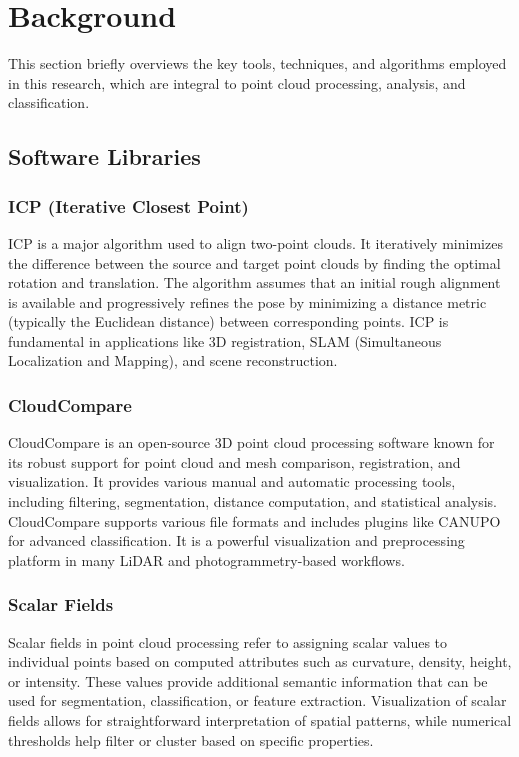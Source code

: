 \documentclass[../report.tex]{subfiles}
\begin{document}
    \section{Background}
    \label{sec:background}
    This section briefly overviews the key tools, techniques, and algorithms employed in this research, which are integral to point cloud processing, analysis, and classification.
    \subsection{Software Libraries}
    \subsubsection{\textbf{ICP} (Iterative Closest Point)}
    ICP\cite{ICP} is a major algorithm used to align two-point clouds. It iteratively minimizes the difference between the source and target point clouds by finding the optimal rotation and translation. The algorithm assumes that an initial rough alignment is available and progressively refines the pose by minimizing a distance metric (typically the Euclidean distance) between corresponding points. ICP is fundamental in applications like 3D registration, SLAM (Simultaneous Localization and Mapping), and scene reconstruction.
    
    \subsubsection{\textbf{CloudCompare}}
    
    CloudCompare\cite{CloudCompare} is an open-source 3D point cloud processing software known for its robust support for point cloud and mesh comparison, registration, and visualization. It provides various manual and automatic processing tools, including filtering, segmentation, distance computation, and statistical analysis. CloudCompare supports various file formats and includes plugins like CANUPO for advanced classification. It is a powerful visualization and preprocessing platform in many LiDAR and photogrammetry-based workflows.
    
    \subsubsection{\textbf{Scalar Fields}}
    
    Scalar fields in point cloud processing refer to assigning scalar values to individual points based on computed attributes such as curvature, density, height, or intensity. These values provide additional semantic information that can be used for segmentation, classification, or feature extraction. Visualization of scalar fields allows for straightforward interpretation of spatial patterns, while numerical thresholds help filter or cluster based on specific properties.
    
\end{document}

